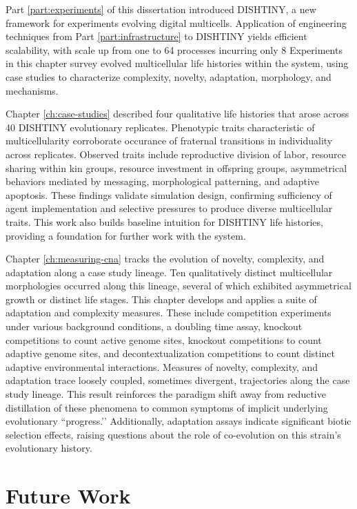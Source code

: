 Part \ref{part:experiments} of this dissertation introduced DISHTINY, a new framework for experiments evolving digital multicells. Application of engineering techniques from Part \ref{part:infrastructure} to DISHTINY yields efficient scalability, with scale up from one to 64 processes incurring only 8%
Experiments in this chapter survey evolved multicellular life histories within the system, using case studies to characterize complexity, novelty, adaptation, morphology, and mechanisms.

Chapter \ref{ch:case-studies} described four qualitative life histories that arose across 40 DISHTINY evolutionary replicates.
Phenotypic traits characteristic of multicellularity corroborate occurance of fraternal transitions in individuality across replicates.
Observed traits include reproductive division of labor, resource sharing within kin groups, resource investment in offspring groups, asymmetrical behaviors mediated by messaging, morphological patterning, and adaptive apoptosis.
These findings validate simulation design, confirming sufficiency of agent implementation and selective pressures to produce diverse multicellular traits.
This work also builds baseline intuition for DISHTINY life histories, providing a foundation for further work with the system.

Chapter \ref{ch:measuring-cna} tracks the evolution of novelty, complexity, and adaptation along a case study lineage.
Ten qualitatively distinct multicellular morphologies occurred along this lineage, several of which exhibited asymmetrical growth or distinct life stages.
This chapter develops and applies a suite of adaptation and complexity measures.
These include competition experiments under various background conditions, a doubling time assay, knockout competitions to count active genome sites, knockout competitions to count adaptive genome sites, and decontextualization competitions to count distinct adaptive environmental interactions.
Measures of novelty, complexity, and adaptation trace loosely coupled, sometimes divergent, trajectories along the case study lineage.
This result reinforces the paradigm shift away from reductive distillation of these phenomena to common symptoms of implicit underlying evolutionary ``progress.’’
Additionally, adaptation assays indicate significant biotic selection effects, raising questions about the role of co-evolution on this strain’s evolutionary history.

\section{Future Work}

